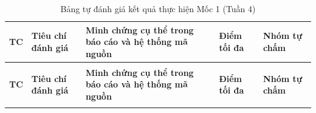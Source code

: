 \documentclass[12pt,a4paper,oneside,openany]{report}
\renewcommand{\arraystretch}{1.25}
\begin{document}
\begingroup
\small
\renewcommand{\arraystretch}{1.15}
\setlength{\extrarowheight}{1pt}
\begin{xltabular}{\textwidth}{|>{\centering\arraybackslash}p{0.8cm}|p{3.2cm}|X|>{\centering\arraybackslash}p{1.2cm}|>{\centering\arraybackslash}p{1.2cm}|}
  \caption{Bảng tự đánh giá kết quả thực hiện Mốc 1 (Tuần 4)} \label{tab:tudanhgia_kt1} \\
  \hline
  \textbf{TC} & \textbf{Tiêu chí đánh giá} & \textbf{Minh chứng cụ thể trong báo cáo và hệ thống mã nguồn} & \textbf{Điểm tối đa} & \textbf{Nhóm tự chấm} \\ \hline
  \endfirsthead

   \\[4pt] \hline
  \textbf{TC} & \textbf{Tiêu chí đánh giá} & \textbf{Minh chứng cụ thể trong báo cáo và hệ thống mã nguồn} & \textbf{Điểm tối đa} & \textbf{Nhóm tự chấm} \\ \hline
  \endhead

  \hline
  \endfoot

  \hline
  \endlastfoot


\end{xltabular}
\end{document}
